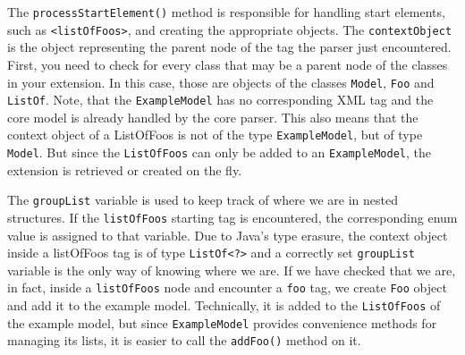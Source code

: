 The \texttt{processStartElement()} method is responsible for handling start elements, such as \texttt{<listOfFoos>}, and creating the appropriate objects.
The \texttt{contextObject} is the object representing the parent node of the tag the parser just encountered.
First, you need to check for every class that may be a parent node of the classes in your extension.
In this case, those are objects of the classes \texttt{Model}, \texttt{Foo} and \texttt{ListOf}.
Note, that the \texttt{ExampleModel} has no corresponding XML tag and the core model is already handled by the core parser.
This also means that the context object of a ListOfFoos is not of the type \texttt{ExampleModel}, but of type \texttt{Model}.
But since the \texttt{ListOfFoos} can only be added to an \texttt{ExampleModel}, the extension is retrieved or created on the fly.

The \texttt{groupList} variable is used to keep track of where we are in nested structures.
If the \texttt{listOfFoos} starting tag is encountered, the corresponding enum value is assigned to that variable.
Due to Java's type erasure, the context object inside a listOfFoos tag is of type \texttt{ListOf<?>} and a correctly set \texttt{groupList} variable is the only way of knowing where we are.
If we have checked that we are, in fact, inside a \texttt{listOfFoos} node and encounter a \texttt{foo} tag, we create \texttt{Foo} object and add it to the example model.
Technically, it is added to the \texttt{ListOfFoos} of the example model, but since \texttt{ExampleModel} provides convenience methods for managing its lists, it is easier to call the \texttt{addFoo()} method on it.

